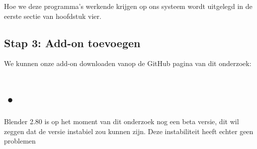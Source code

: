 Hoe we deze programma's werkende krijgen op ons systeem wordt uitgelegd in de eerste sectie van hoofdstuk vier. 
\par

\subsection{Stap 3: Add-on toevoegen}
We kunnen onze add-on downloaden vanop de GitHub pagina van dit onderzoek: 
   

  
\section{•}
Blender 2.80 is op het moment van dit onderzoek nog een beta versie, dit wil zeggen dat de versie instabiel zou kunnen zijn. Deze instabiliteit heeft echter geen problemen 
   